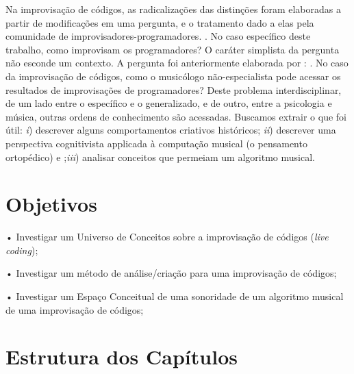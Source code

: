 Na improvisação de códigos, as radicalizações das distinções foram elaboradas a partir de modificações em uma pergunta, e o tratamento dado a elas pela comunidade de improvisadores-programadores. \cite{pressing_improvisation_1987}. No caso específico deste trabalho, como improvisam os programadores? O caráter simplista da pergunta não esconde um contexto. A pergunta foi anteriormente elaborada por : . No caso da improvisação de códigos, como o musicólogo não-especialista pode acessar os resultados de improvisações de programadores? Deste problema interdisciplinar, de um lado entre o específico e o generalizado, e de outro, entre a psicologia e música, outras ordens de conhecimento são acessadas. Buscamos extrair o que foi útil: \emph{i}) descrever alguns comportamentos criativos históricos; \emph{ii}) descrever uma perspectiva cognitivista applicada à computação musical (o pensamento ortopédico) e ;\emph{iii}) analisar conceitos que permeiam um algoritmo musical. 

\section*{Objetivos}\label{sec:objetivos}

• Investigar um Universo de Conceitos sobre a improvisação de códigos (\emph{live coding});

• Investigar um método de análise/criação para uma improvisação de códigos;

• Investigar um Espaço Conceitual de uma sonoridade de um algoritmo musical de uma improvisação de códigos;

\section*{Estrutura dos Capítulos}

